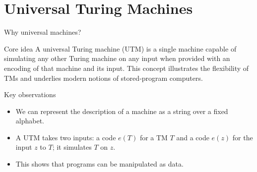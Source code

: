 %

\section{Universal Turing Machines}

\begin{frame}[t]{Why universal machines?}
  \begin{tblock}{Core idea}
    A universal Turing machine (UTM) is a single machine capable of
    simulating any other Turing machine on any input when provided
    with an encoding of that machine and its input.  This concept
    illustrates the flexibility of TMs and underlies modern notions of
    stored‑program computers.
  \end{tblock}
  \begin{tblock}{Key observations}
    \begin{itemize}
      \item We can represent the description of a machine as a string
        over a fixed alphabet.
      \item A UTM takes two inputs: a code $e(T)$ for a TM $T$ and a
        code $e(z)$ for the input $z$ to $T$; it simulates $T$ on $z$.
      \item This shows that programs can be manipulated as data.
    \end{itemize}
  \end{tblock}
  \label{fr:7.8-01}
\end{frame}


